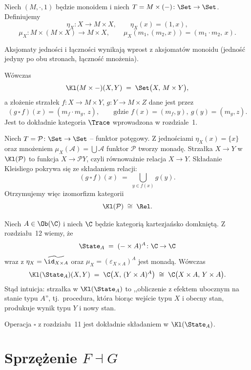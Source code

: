 \begin{przyklad}
Niech $(M,\cdot,1)$ będzie monoidem i niech $T = M\times(-)\colon \Set\to\Set$. Definiujemy
\[
\eta_X\colon X\to M\times X, \qquad \eta_X(x) = (1,x),
\]
\[
\mu_X\colon M\times(M\times X)\to M\times X, \qquad \mu_X(m_1,(m_2,x)) = (m_1\cdot m_2,\, x).
\]
\begin{uwaga}
Aksjomaty jedności i łączności wynikają wprost z aksjomatów monoidu (jedność jedyny po obu stronach, łączność mnożenia).
\end{uwaga}
Wówczas
\[
\Kl(M\times{-})(X,Y) \;=\; \Set\bigl(X,\, M\times Y\bigr),
\]
a złożenie strzałek $f\colon X\to M\times Y$, $g\colon Y\to M\times Z$ dane jest przez
\[
(g\,\square\, f)(x) = (m_f\cdot m_g,\, z), \qquad \text{gdzie } f(x)=(m_f,y),\ g(y)=(m_g,z).
\]
Jest to dokładnie kategoria $\Trace$ wprowadzona w rozdziale~1.
\end{przyklad}

\begin{przyklad}
Niech $T = \mathcal{P}\colon \Set\to\Set$ -- funktor potęgowy. Z jednościami $\eta_X(x)=\{x\}$ oraz mnożeniem $\mu_X(\mathcal{A}) = \bigcup\mathcal{A}$ funktor $\mathcal{P}$ tworzy monadę. Strzałka $X\to Y$ w $\Kl(\mathcal{P})$ to funkcja $X\to \mathcal{P}Y$, czyli równoważnie relacja $X\to Y$. Składanie Kleisliego pokrywa się ze składaniem relacji:
\[
(g\,\square\, f)(x) \;=\; \bigcup_{y\in f(x)} g(y).
\]
Otrzymujemy więc izomorfizm kategorii
\[
\Kl(\mathcal{P}) \;\cong\; \Rel.
\]
\end{przyklad}

\begin{przyklad}
Niech $A\in\Ob(\C)$ i niech $\C$ będzie kategorią kartezjańsko domkniętą. Z rozdziału~12 wiemy, że
\[
\State_A \;=\; (-\times A)^A\colon \C\to\C
\]
wraz z $\eta_X = \widetilde{\id_{X\times A}}$ oraz $\mu_X = (\varepsilon_{X\times A})^A$ jest monadą. Wówczas
\[
\Kl(\State_A)(X,Y) \;=\; \C\bigl(X,\, (Y\times A)^A\bigr) \;\cong\; \C\bigl(X\times A,\, Y\times A\bigr).
\]
Stąd intuicja: strzałka w $\Kl(\State_A)$ to ,,obliczenie z efektem ubocznym na stanie typu $A$'', tj.\ procedura, która biorąc wejście typu $X$ i obecny stan, produkuje wynik typu $Y$ i nowy stan.

Operacja $\square$ z rozdziału~11 jest dokładnie składaniem w $\Kl(\State_A)$.
\end{przyklad}

\section{Sprzężenie $F\dashv G$}

